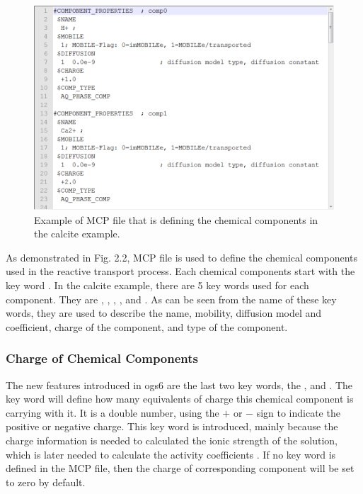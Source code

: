 \begin{figure}
\includegraphics[width=\textwidth]{RT/figs/RT_fig_mcp_file}
\caption{Example of MCP file that is defining the chemical components in the calcite example.}
\label{fig:RT_mcp_file}
\end{figure}

As demonstrated in Fig. 2.2, MCP file is used to define the chemical components used in the reactive transport process. Each chemical components start with the key word . In the calcite example, there are 5 key words used for each component. They are , , , , and . As can be seen from the name of these key words, they are used to describe the name, mobility, diffusion model and coefficient, charge of the component, and type of the component. 

\subsubsection{Charge of Chemical Components}

The new features introduced in ogs6 are the last two key words, the , and . The  key word will define how many equivalents of charge this chemical component is carrying with it. It is a double number, using the $+$ or $-$ sign to indicate the positive or negative charge. This key word is introduced, mainly because the charge information is needed to calculated the ionic strength of the solution, which is later needed to calculate the activity coefficients . If no  key word is defined in the MCP file, then the charge of corresponding component will be set to zero by default. 

